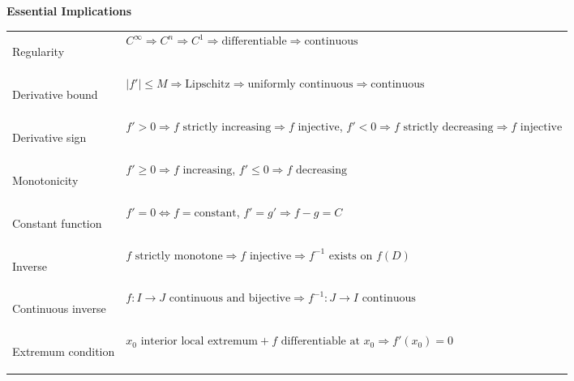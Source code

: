 
{\scriptsize
\renewcommand{\arraystretch}{1}
\setlength{\tabcolsep}{2pt}

\noindent
\begin{minipage}[t]{0.495\textwidth}
\vspace{0pt}

\textbf{\large Essential Implications}\par
\vspace{2pt}

\begin{tabular}{
    @{}
    >{\bfseries\raggedright\arraybackslash}p{2.9cm}
    >{\raggedright\arraybackslash}p{10.5cm}
    @{}
}
\toprule

Regularity &
$C^\infty \Rightarrow C^n \Rightarrow C^1
\Rightarrow \text{differentiable}
\Rightarrow \text{continuous}$ \\

Derivative bound &
$|f'|\le M
\Rightarrow \text{Lipschitz}
\Rightarrow \text{uniformly continuous}
\Rightarrow \text{continuous}$ \\

Derivative sign &
$f'>0 \Rightarrow f\text{ strictly increasing}
\Rightarrow f\text{ injective}$,
\quad
$f'<0 \Rightarrow f\text{ strictly decreasing}
\Rightarrow f\text{ injective}$ \\

Monotonicity &
$f'\ge0 \Rightarrow f\text{ increasing}$,
\quad
$f'\le0 \Rightarrow f\text{ decreasing}$ \\

Constant function &
$f'=0 \Longleftrightarrow f=\text{constant}$,
\qquad
$f'=g' \Rightarrow f-g=C$ \\

Inverse &
$f\text{ strictly monotone}
\Rightarrow f\text{ injective}
\Rightarrow f^{-1}\text{ exists on }f(D)$ \\

Continuous inverse &
$f:I\to J\text{ continuous and bijective}
\Rightarrow f^{-1}:J\to I\text{ continuous}$ \\

Extremum condition &
$x_0\text{ interior local extremum}+
f\text{ differentiable at }x_0
\Rightarrow f'(x_0)=0$ \\


\end{tabular}
\end{minipage}}
